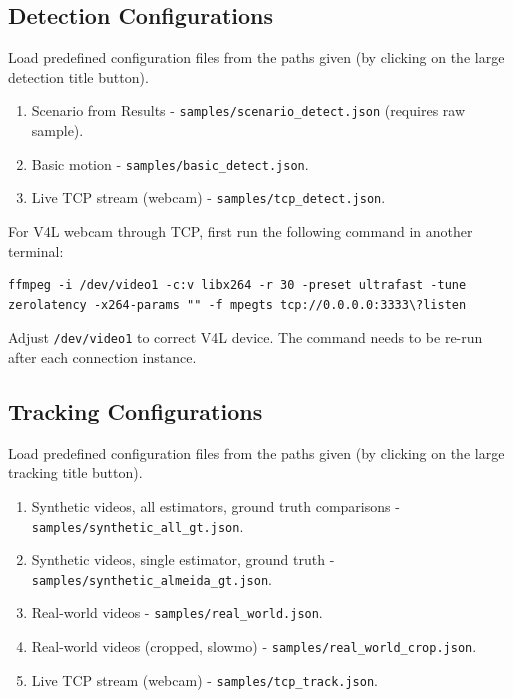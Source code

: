 \documentclass[11pt,english]{report}
\begin{document}
\subsection*{Detection Configurations}

Load predefined configuration files from the paths given (by clicking on the large detection title button).

\begin{enumerate}
\def\labelenumi{\arabic{enumi}.}
\item
  Scenario from Results - \texttt{samples/scenario\_detect.json} (requires raw sample).
\item
  Basic motion - \texttt{samples/basic\_detect.json}.
\item
  Live TCP stream (webcam) - \texttt{samples/tcp\_detect.json}.
\end{enumerate}

For V4L webcam through TCP, first run the following command in another terminal:

\begin{lstlisting}
ffmpeg -i /dev/video1 -c:v libx264 -r 30 -preset ultrafast -tune zerolatency -x264-params "" -f mpegts tcp://0.0.0.0:3333\?listen
\end{lstlisting}

Adjust \texttt{/dev/video1} to correct V4L device. The command needs to be re-run after each connection instance.

\subsection*{Tracking Configurations}

Load predefined configuration files from the paths given (by clicking on the large tracking title button).

\begin{enumerate}
\def\labelenumi{\arabic{enumi}.}
\item
  Synthetic videos, all estimators, ground truth comparisons - \texttt{samples/synthetic\_all\_gt.json}.
\item
  Synthetic videos, single estimator, ground truth - \texttt{samples/synthetic\_almeida\_gt.json}.
\item
  Real-world videos - \texttt{samples/real\_world.json}.
\item
  Real-world videos (cropped, slowmo) - \texttt{samples/real\_world\_crop.json}.
\item
  Live TCP stream (webcam) - \texttt{samples/tcp\_track.json}.
\end{enumerate}
\end{document}
